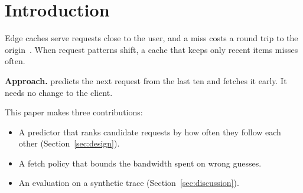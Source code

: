 \section{Introduction}
\label{sec:intro}

Edge caches serve requests close to the user, and a miss costs a round trip to the origin~\cite{Doe2029}.
When request patterns shift, a cache that keeps only recent items misses often.

\textbf{Approach.} \examplesys{} predicts the next request from the last ten and fetches it early.
It needs no change to the client.

This paper makes three contributions:
\begin{itemize}
\item A predictor that ranks candidate requests by how often they follow each other (Section~\ref{sec:design}).
\item A fetch policy that bounds the bandwidth spent on wrong guesses.
\item An evaluation on a synthetic trace (Section~\ref{sec:discussion}).
\end{itemize}
